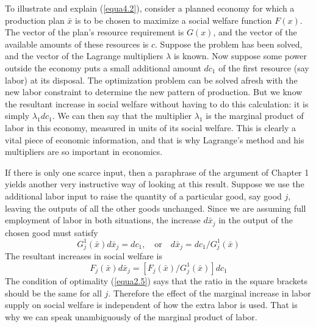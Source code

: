To illustrate and explain (\ref{equa4.2}), consider a planned economy for which a production plan $\bar{x}$ is to be chosen to maximize a social welfare function $F(x)$. The vector of the plan's resource requirement is $G(x)$, and the vector of the available amounts of these resources is $c$. Suppose the problem has been solved, and the vector of the Lagrange multipliers $\lambda$ is known. Now suppose some power outside the economy puts a small additional amount $dc_1$ of the first resource (say labor) at its disposal. The optimization problem can be solved afresh with the new labor constraint to determine the new pattern of production. But we know the resultant increase in social welfare without having to do this calculation: it is simply $\lambda_1 dc_1$. We can then say that the multiplier $\lambda_1$ is the marginal product of labor in this economy, measured in units of its social welfare. This is clearly a vital piece of economic information, and that is why Lagrange's method and his multipliers are so important in economics.

If there is only one scarce input, then a paraphrase of the argument of Chapter 1 yields another very instructive way of looking at this result. Suppose we use the additional labor input to raise the quantity of a particular good, say good $j$, leaving the outputs of all the other goods unchanged. Since we are assuming full employment of labor in both situations, the increase $d\bar{x}_j$ in the output of the chosen good must satisfy
\begin{equation*}
G_j^1(\bar{x}) d\bar{x}_j = dc_1, \quad \mbox{or} \quad d\bar{x}_j = dc_1 / G_j^1(\bar{x})
\end{equation*}
The resultant increases in social welfare is
\begin{equation*}
F_j(\bar{x}) d\bar{x}_j =  [F_j(\bar{x})/ G_j^1(\bar{x})]  dc_1
\end{equation*}
The condition of optimality (\ref{equa2.5}) says that the ratio in the square brackets should be the same for all $j$. Therefore the effect of the marginal increase in labor supply on social welfare is independent of how the extra labor is used. That is why we can speak unambiguously of the marginal product of labor.

